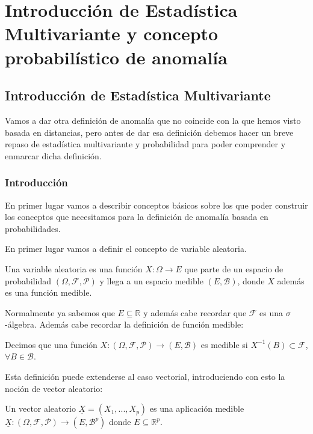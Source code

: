 \part{Introducción de Estadística Multivariante y concepto probabilístico de anomalía}
\label{part:multivariante_anomalia2}

\chapter{Introducción de Estadística Multivariante}
\label{chapter:estadistica_multivariante}

Vamos a dar otra definición de anomalía que no coincide con la que hemos visto basada en distancias, pero antes de dar esa definición debemos hacer un breve repaso de estadística multivariante y probabilidad para poder comprender y enmarcar dicha definición.

\section{Introducción}

En primer lugar vamos a describir conceptos básicos sobre los que poder construir los conceptos que necesitamos para la definición de anomalía basada en probabilidades.

En primer lugar vamos a definir el concepto de variable aleatoria.

\begin{definicion}
	Una variable aleatoria es una función $X:\Omega \rightarrow E$ que parte de un espacio de probabilidad $(\Omega , \mathcal{F}, \mathcal{P})$ y llega a un espacio medible $(E, \mathcal{B})$, donde $X$ además es una función medible.
\end{definicion}

Normalmente ya sabemos que $E\subseteq \mathbb{R}$ y además cabe recordar que $\mathcal{F}$ es una $\sigma$-álgebra. Además cabe recordar la definición de función medible:

\begin{definicion}
	Decimos que una función $X: (\Omega , \mathcal{F}, \mathcal{P}) \rightarrow (E, \mathcal{B})$ es medible si $X^{-1}(B)\subset \mathcal{F}$, $\forall B \in \mathcal{B}$.
\end{definicion}

Esta definición puede extenderse al caso vectorial, introduciendo con esto la noción de vector aleatorio:

\begin{definicion}
	Un vector aleatorio $\underline{X} = (X_1 , ... , X_p)$ es una aplicación medible $\underline{X}: (\Omega , \mathcal{F}, \mathcal{P})\rightarrow (E, \mathcal{B}^p)$ donde $E\subseteq \mathbb{R}^p$.
\end{definicion}

